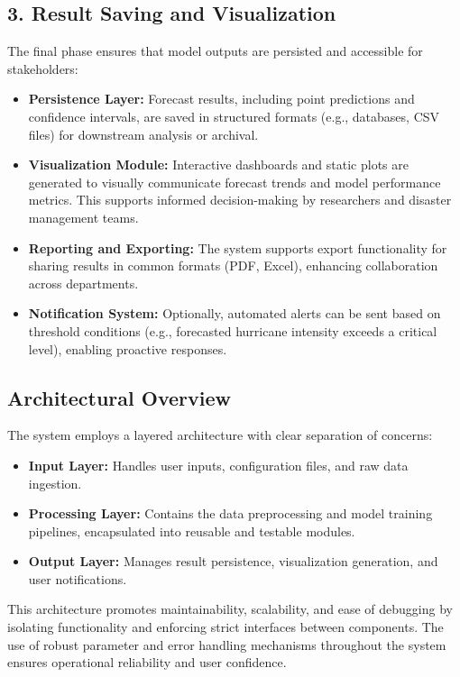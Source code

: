 \subsection*{3. Result Saving and Visualization}

The final phase ensures that model outputs are persisted and accessible for stakeholders:

\begin{itemize}
	\item \textbf{Persistence Layer:} Forecast results, including point predictions and confidence intervals, are saved in structured formats (e.g., databases, CSV files) for downstream analysis or archival.
	\item \textbf{Visualization Module:} Interactive dashboards and static plots are generated to visually communicate forecast trends and model performance metrics. This supports informed decision-making by researchers and disaster management teams.
	\item \textbf{Reporting and Exporting:} The system supports export functionality for sharing results in common formats (PDF, Excel), enhancing collaboration across departments.
	\item \textbf{Notification System:} Optionally, automated alerts can be sent based on threshold conditions (e.g., forecasted hurricane intensity exceeds a critical level), enabling proactive responses.
\end{itemize}

\subsection*{Architectural Overview}

The system employs a layered architecture with clear separation of concerns:

\begin{itemize}
	\item \textbf{Input Layer:} Handles user inputs, configuration files, and raw data ingestion.
	\item \textbf{Processing Layer:} Contains the data preprocessing and model training pipelines, encapsulated into reusable and testable modules.
	\item \textbf{Output Layer:} Manages result persistence, visualization generation, and user notifications.
\end{itemize}

This architecture promotes maintainability, scalability, and ease of debugging by isolating functionality and enforcing strict interfaces between components. The use of robust parameter and error handling mechanisms throughout the system ensures operational reliability and user confidence.



